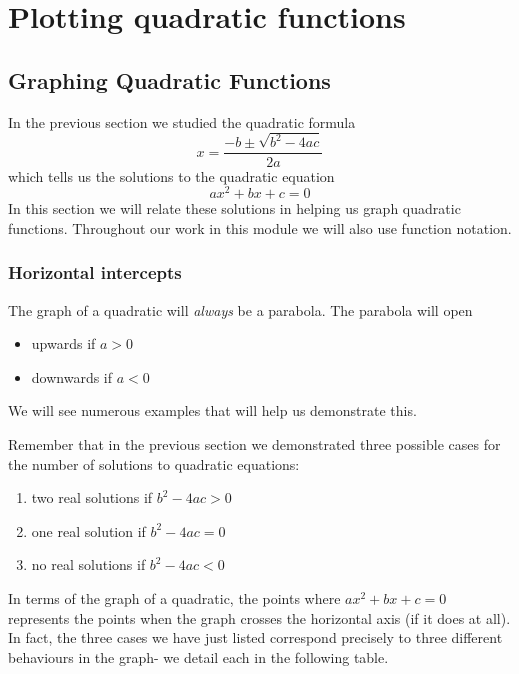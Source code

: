 \chapter{Plotting quadratic functions}
\minitoc

\section{Graphing Quadratic Functions}
%
In the previous section we studied the \gls{quadratic} formula
\[
	x = \frac{-b\pm \sqrt{b^2-4ac}}{2a}
\]
which tells us the solutions to the quadratic \gls{equation}
\[
	ax^2+bx+c=0
\]
In this section we will relate these solutions in helping us graph quadratic functions. Throughout 
our work in this module we will also use function notation.

\subsection{Horizontal intercepts}
The graph of a quadratic will {\em always} be a parabola. The parabola will open
\begin{itemize}
	\item upwards if $a>0$
	\item downwards if $a<0$
\end{itemize} 
We will see numerous examples that will help us demonstrate this. 

Remember that in the previous section we demonstrated three possible cases for the
number of solutions to quadratic equations:
\begin{enumerate}
	\item two real solutions if $b^2-4ac>0$
	\item one real \gls{solution} if $b^2-4ac=0$
	\item no real solutions if $b^2-4ac<0$
\end{enumerate} 

In terms of the graph of a quadratic, the points where $ax^2+bx+c=0$ represents the
points when the graph crosses the horizontal axis (if it does at all). In fact, the 
three cases we have just listed correspond precisely to three different behaviours in
the graph- we detail each in the following table.

